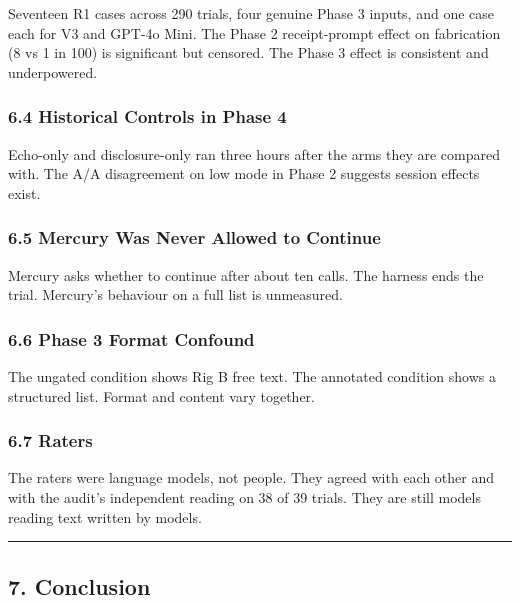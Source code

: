 \documentclass[
]{article}
\begin{document}
Seventeen R1 cases across 290 trials, four genuine Phase 3 inputs, and
one case each for V3 and GPT-4o Mini. The Phase 2 receipt-prompt effect
on fabrication (8 vs 1 in 100) is significant but censored. The Phase 3
effect is consistent and underpowered.

\subsubsection{6.4 Historical Controls in Phase
4}\label{historical-controls-in-phase-4}

Echo-only and disclosure-only ran three hours after the arms they are
compared with. The A/A disagreement on low mode in Phase 2 suggests
session effects exist.

\subsubsection{6.5 Mercury Was Never Allowed to
Continue}\label{mercury-was-never-allowed-to-continue}

Mercury asks whether to continue after about ten calls. The harness ends
the trial. Mercury's behaviour on a full list is unmeasured.

\subsubsection{6.6 Phase 3 Format
Confound}\label{phase-3-format-confound}

The ungated condition shows Rig B free text. The annotated condition
shows a structured list. Format and content vary together.

\subsubsection{6.7 Raters}\label{raters}

The raters were language models, not people. They agreed with each other
and with the audit's independent reading on 38 of 39 trials. They are
still models reading text written by models.

\begin{center}\rule{0.5\linewidth}{0.5pt}\end{center}

\subsection{7. Conclusion}\label{conclusion}
\end{document}
